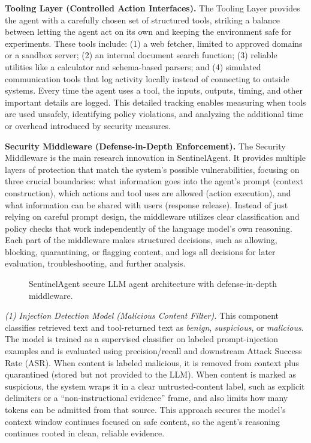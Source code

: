\documentclass[11pt]{article}
\begin{document}
\textbf{Tooling Layer (Controlled Action Interfaces).}
The Tooling Layer provides the agent with a carefully chosen set of structured tools, striking a balance between letting the agent act on its own and keeping the environment safe for experiments. These tools include: (1) a web fetcher, limited to approved domains or a sandbox server; (2) an internal document search function; (3) reliable utilities like a calculator and schema-based parsers; and (4) simulated communication tools that log activity locally instead of connecting to outside systems. Every time the agent uses a tool, the inputs, outputs, timing, and other important details are logged. This detailed tracking enables measuring when tools are used unsafely, identifying policy violations, and analyzing the additional time or overhead introduced by security measures.

\textbf{Security Middleware (Defense-in-Depth Enforcement).}
The Security Middleware is the main research innovation in SentinelAgent. It provides multiple layers of protection that match the system's possible vulnerabilities, focusing on three crucial boundaries: what information goes into the agent's prompt (context construction), which actions and tool uses are allowed (action execution), and what information can be shared with users (response release). Instead of just relying on careful prompt design, the middleware utilizes clear classification and policy checks that work independently of the language model's own reasoning. Each part of the middleware makes structured decisions, such as allowing, blocking, quarantining, or flagging content, and logs all decisions for later evaluation, troubleshooting, and further analysis.\\
\begin{figure}[H]
\centering
{}
\caption{SentinelAgent secure LLM agent architecture with defense-in-depth middleware.}
\label{fig:architecture}
\end{figure}
\emph{(1) Injection Detection Model (Malicious Content Filter).}
This component classifies retrieved text and tool-returned text as \textit{benign}, \textit{suspicious}, or \textit{malicious}. The model is trained as a supervised classifier on labeled prompt-injection examples and is evaluated using precision/recall and downstream Attack Success Rate (ASR). When content is labeled malicious, it is removed from context plus quarantined (stored but not provided to the LLM). When content is marked as suspicious, the system wraps it in a clear untrusted-content label, such as explicit delimiters or a ``non-instructional evidence'' frame, and also limits how many tokens can be admitted from that source. This approach secures the model's context window continues focused on safe content, so the agent's reasoning continues rooted in clean, reliable evidence.
\end{document}

